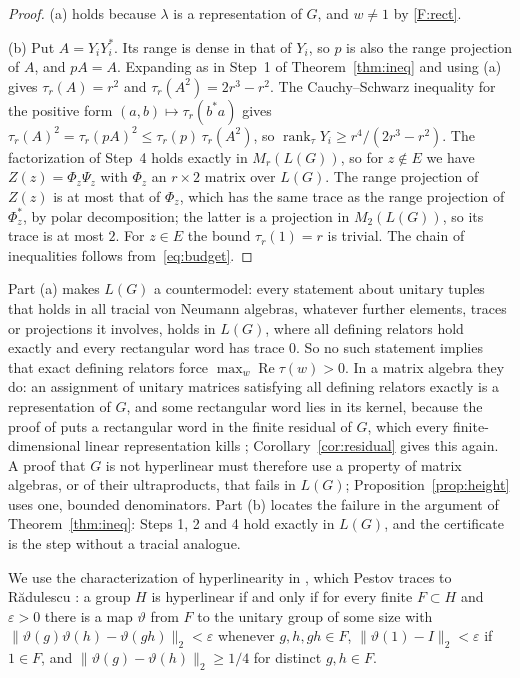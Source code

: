 \documentclass[11pt]{article}
\theoremstyle{definition}
\theoremstyle{remark}
\numberwithin{equation}{section}
\DeclareMathOperator{\rank}{rank}
\newcommand{\eps}{\varepsilon}
\begin{document}
\begin{proof}
(a) holds because $\lambda$ is a representation of $G$, and $w\ne1$ by \ref{F:rect}.

(b) Put $A=Y_iY_i^*$. Its range is dense in that of $Y_i$, so $p$ is also the range projection of $A$, and $pA=A$. Expanding as in Step~1 of Theorem~\ref{thm:ineq} and using (a) gives $\tau_r(A)=r^2$ and $\tau_r(A^2)=2r^3-r^2$. The Cauchy--Schwarz inequality for the positive form $(a,b)\mapsto\tau_r(b^*a)$ gives $\tau_r(A)^2=\tau_r(pA)^2\le\tau_r(p)\,\tau_r(A^2)$, so $\rank_\tau Y_i\ge r^4/(2r^3-r^2)$. The factorization of Step~4 holds exactly in $M_r(L(G))$, so for $z\notin E$ we have $Z(z)=\Phi_z\Psi_z$ with $\Phi_z$ an $r\times2$ matrix over $L(G)$. The range projection of $Z(z)$ is at most that of $\Phi_z$, which has the same trace as the range projection of $\Phi_z^*$, by polar decomposition; the latter is a projection in $M_2(L(G))$, so its trace is at most $2$. For $z\in E$ the bound $\tau_r(1)=r$ is trivial. The chain of inequalities follows from~\eqref{eq:budget}.
\end{proof}

Part (a) makes $L(G)$ a countermodel: every statement about unitary tuples that holds in all tracial von Neumann algebras, whatever further elements, traces or projections it involves, holds in $L(G)$, where all defining relators hold exactly and every rectangular word has trace $0$. So no such statement implies that exact defining relators force $\max_w\operatorname{Re}\tau(w)>0$. In a matrix algebra they do: an assignment of unitary matrices satisfying all defining relators exactly is a representation of $G$, and some rectangular word lies in its kernel, because the proof of \cite[Theorem~1.1]{OAI252} puts a rectangular word in the finite residual of $G$, which every finite-dimensional linear representation kills \cite[Corollary~1.2]{OAI252}; Corollary~\ref{cor:residual} gives this again. A proof that $G$ is not hyperlinear must therefore use a property of matrix algebras, or of their ultraproducts, that fails in $L(G)$; Proposition~\ref{prop:height} uses one, bounded denominators. Part (b) locates the failure in the argument of Theorem~\ref{thm:ineq}: Steps 1, 2 and 4 hold exactly in $L(G)$, and the certificate is the step without a tracial analogue.

We use the characterization of hyperlinearity in \cite[Theorem~3.6]{Pestov2008}, which Pestov traces to R\u{a}dulescu \cite{Radulescu2000}: a group $H$ is hyperlinear if and only if for every finite $F\subset H$ and $\eps>0$ there is a map $\vartheta$ from $F$ to the unitary group of some size with $\|\vartheta(g)\vartheta(h)-\vartheta(gh)\|_2<\eps$ whenever $g,h,gh\in F$, $\|\vartheta(1)-I\|_2<\eps$ if $1\in F$, and $\|\vartheta(g)-\vartheta(h)\|_2\ge1/4$ for distinct $g,h\in F$.
\end{document}
